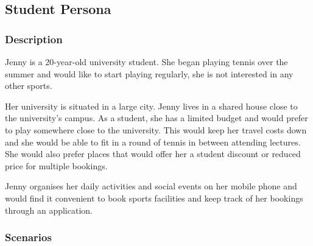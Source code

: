 \subsection{Student Persona}
\label{sub:student_persona}


\subsubsection*{Description}
\label{ssub:student_description}

Jenny is a 20-year-old university student. She began playing tennis
over the summer and would like to start playing regularly, she is not
interested in any other sports.

Her university is situated in a large city. Jenny lives in a shared
house close to the university's campus. As a student, she has a limited
budget and would prefer to play somewhere close to the university. This
would keep her travel costs down and she would be able to fit in a
round of tennis in between attending lectures. She would also prefer
places that would offer her a student discount or reduced price for
multiple bookings.

Jenny organises her daily activities and social events on her mobile
phone and would find it convenient to book sports facilities and keep
track of her bookings through an application.


\subsubsection*{Scenarios}
\label{ssub:student_scenarios}

